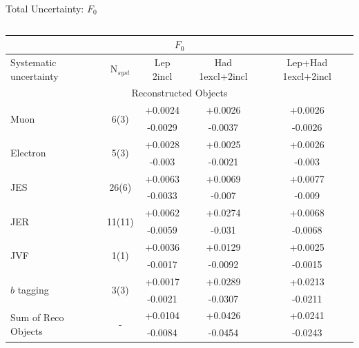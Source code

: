 \documentclass{beamer}
\newcommand*{\fo}{\ensuremath{F_{\text{0}}}\xspace}
\newcommand*{\bt}{\ensuremath{b}\xspace}
\begin{document}
{\begin{frame}{Total Uncertainty: \fo}
\begin{columns}
\begin{table}[h!]
        \begin{tabular}{lcccc}
          \hline\hline
          \multicolumn{5}{c}{\fo}\\
          \hline
          Systematic uncertainty & N$_{syst}$ & Lep 2incl & Had 1excl+2incl & Lep+Had 1excl+2incl \\\hline
          \multicolumn{5}{c}{Reconstructed Objects} \\\hline
          \multirow{2}{*}{Muon} & \multirow{2}{*}{6(3)} & +0.0024 & +0.0026 & +0.0026\\
                                 &                       & -0.0029 & -0.0037 & -0.0026\\\hline
          \multirow{2}{*}{Electron} & \multirow{2}{*}{5(3)} & +0.0028 & +0.0025 & +0.0026\\
                                 &                       & -0.003 & -0.0021 & -0.003\\\hline
          \multirow{2}{*}{JES} & \multirow{2}{*}{26(6)} & +0.0063 & +0.0069 & +0.0077\\
                                 &                       & -0.0033 & -0.007 & -0.009\\\hline
          \multirow{2}{*}{JER} & \multirow{2}{*}{11(11)} & +0.0062 & +0.0274 & +0.0068\\
                                 &                       & -0.0059 & -0.031 & -0.0068\\\hline
          \multirow{2}{*}{JVF} & \multirow{2}{*}{1(1)} & +0.0036 & +0.0129 & +0.0025\\
                                 &                       & -0.0017 & -0.0092 & -0.0015\\\hline
          \multirow{2}{*}{\bt tagging} & \multirow{2}{*}{3(3)} & +0.0017 & +0.0289 & +0.0213\\
                                 &                       & -0.0021 & -0.0307 & -0.0211\\\hline
          
          \hline\hline
          \multirow{2}{*}{Sum of Reco Objects} & \multirow{2}{*}{-} & +0.0104 & +0.0426 & +0.0241\\
                                 &                       & -0.0084 & -0.0454 & -0.0243\\\hline
          

\end{tabular}
\end{table}
\end{columns}
\end{frame}}
\end{document}
